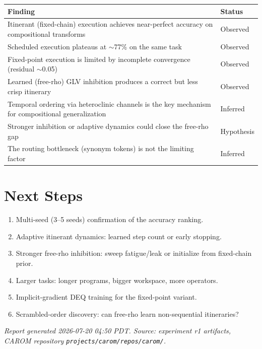 \documentclass[11pt]{article}
\begin{document}
\begin{table}[H]
\centering
\begin{tabular}{p{} p{}}
\toprule
\textbf{Finding} & \textbf{Status} \\
\midrule
Itinerant (fixed-chain) execution achieves near-perfect accuracy on compositional transforms & Observed \\
Scheduled execution plateaus at $\sim$77\% on the same task & Observed \\
Fixed-point execution is limited by incomplete convergence (residual $\sim$0.05) & Observed \\
Learned (free-rho) GLV inhibition produces a correct but less crisp itinerary & Observed \\
Temporal ordering via heteroclinic channels is the key mechanism for compositional generalization & Inferred \\
Stronger inhibition or adaptive dynamics could close the free-rho gap & Hypothesis \\
The routing bottleneck (synonym tokens) is not the limiting factor & Inferred \\
\bottomrule
\end{tabular}
\end{table}

\section{Next Steps}

\begin{enumerate}
    \item Multi-seed (3--5 seeds) confirmation of the accuracy ranking.
    \item Adaptive itinerant dynamics: learned step count or early stopping.
    \item Stronger free-rho inhibition: sweep fatigue/leak or initialize from fixed-chain prior.
    \item Larger tasks: longer programs, bigger workspace, more operators.
    \item Implicit-gradient DEQ training for the fixed-point variant.
    \item Scrambled-order discovery: can free-rho learn non-sequential itineraries?
\end{enumerate}

\vfill
\noindent\textit{Report generated 2026-07-20 04:50 PDT. Source: experiment r1 artifacts, CAROM repository \texttt{projects/carom/repos/carom/}.}
\end{document}
